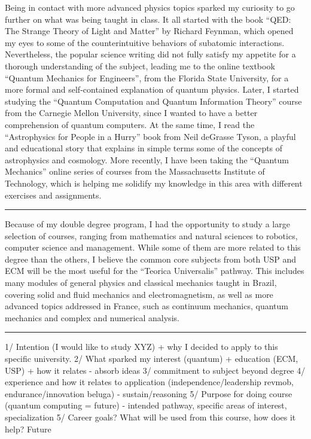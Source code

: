 \documentclass[11pt]{article}
\newcommand*{\NEWLINE}{\vspace{0.75em}}
\begin{document}
Being in contact with more advanced physics topics sparked my curiosity to go further on what was being taught in class. It all started with the book ``QED: The Strange Theory of Light and Matter'' by Richard Feynman, which opened my eyes to some of the counterintuitive behaviors of subatomic interactions. Nevertheless, the popular science writing did not fully satisfy my appetite for a thorough understanding of the subject, leading me to the online textbook ``Quantum Mechanics for Engineers'', from the Florida State University, for a more formal and self-contained explanation of quantum physics. Later, I started studying the ``Quantum Computation and Quantum Information Theory'' course from the Carnegie Mellon University, since I wanted to have a better comprehension of quantum computers. At the same time, I read the ``Astrophysics for People in a Hurry'' book from Neil deGrasse Tyson, a playful and educational story that explains in simple terms some of the concepts of astrophysics and cosmology. More recently, I have been taking the ``Quantum Mechanics'' online series of courses from the Massachusetts Institute of Technology, which is helping me solidify my knowledge in this area with different exercises and assignments.
\NEWLINE{}

\noindent\rule{\textwidth}{1pt}

Because of my double degree program, I had the opportunity to study a large selection of courses, ranging from mathematics and natural sciences to robotics, computer science and management. While some of them are more related to this degree than the others, I believe the common core subjects from both USP and ECM will be the most useful for the “Teorica Universalis” pathway. This includes many modules of general physics and classical mechanics taught in Brazil, covering solid and fluid mechanics and electromagnetism, as well as more advanced topics addressed in France, such as continuum mechanics, quantum mechanics and complex and numerical analysis. 

\noindent\rule{\textwidth}{1pt}

1/ Intention (I would like to study XYZ) + why I decided to apply to this
specific university.
2/ What sparked my interest (quantum) + education (ECM, USP) + how it relates - absorb ideas
3/ commitment to subject beyond degree
4/ experience and how it relates to application (independence/leadership revmob, endurance/innovation beluga) - sustain/reasoning
5/ Purpose for doing course (quantum computing = future) - intended pathway, specific areas of interest, specialization
5/ Career goals? What will be used from this course, how does it help? Future
\end{document}
